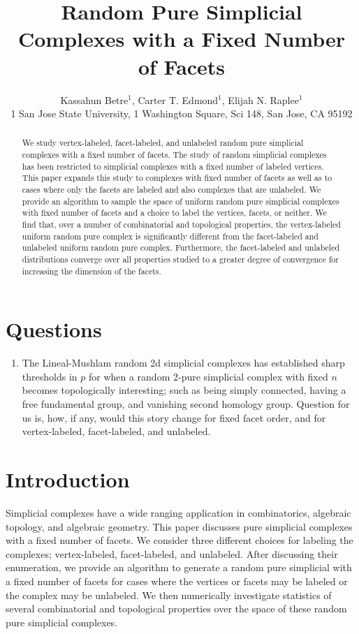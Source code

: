 \documentclass[12pt]{article}
\title{Random Pure Simplicial Complexes with a Fixed Number of Facets}
\author{Kassahun Betre$^1$, Carter T. Edmond$^1$, Elijah N. Raplee$^1$\\1 San Jose State University, 1 Washington Square, Sci 148, San Jose, CA 95192}
\theoremstyle{plain}
\theoremstyle{definition}
\theoremstyle{remark}
\begin{document}
\maketitle

\begin{abstract}
We study vertex-labeled, facet-labeled, and unlabeled random pure simplicial complexes with a fixed number of facets. The study of random simplicial complexes has been restricted to simplicial complexes with a fixed number of labeled vertices. This paper expands this study to complexes with fixed number of facets as well as to cases where only the facets are labeled and also complexes that are unlabeled. We provide an algorithm to sample the space of uniform random pure simplicial complexes with fixed number of facets and a choice to label the vertices, facets, or neither. We find that, over a number of combinatorial and topological properties, the vertex-labeled uniform random pure complex is significantly different from the facet-labeled and unlabeled uniform random pure complex. Furthermore, the facet-labeled and unlabeled distributions converge over all properties studied to a greater degree of convergence for increasing the dimension of the facets.  
\end{abstract}
\clearpage
\def\thefootnote{\fnsymbol{footnote}}
\setcounter{footnote}{0}
%
\tableofcontents
\newpage
\setcounter{page}{1}

\section{Questions}
\begin{enumerate}
    \item The Lineal-Mushlam random 2d simplicial complexes has established sharp thresholds in $p$ for when a random 2-pure simplicial complex with fixed $n$ becomes topologically interesting; such as being simply connected, having a free fundamental group, and vanishing second homology group. Question for us is, how, if any, would this story change for fixed facet order, and for vertex-labeled, facet-labeled, and unlabeled.
\end{enumerate}

\section{Introduction}
Simplicial complexes have a wide ranging application in combinatorics, algebraic topology, and algebraic geometry. This paper discusses pure simplicial complexes with a fixed number of facets. We consider three different choices for labeling the complexes; vertex-labeled, facet-labeled, and unlabeled. After discussing their enumeration, we provide an algorithm to generate a random pure simplicial with a fixed number of facets for cases where the vertices or facets may be labeled or the complex may be unlabeled. We then numerically investigate statistics of several combinatorial and topological properties over the space of these random pure simplicial complexes. 
\end{document}
